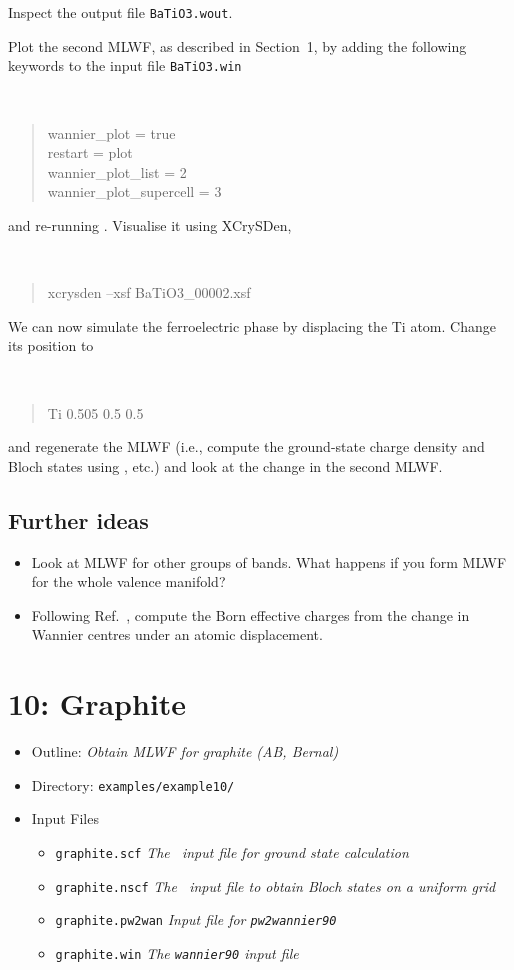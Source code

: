 \documentclass[a4paper,11pt,twoside]{article}
\begin{document}
Inspect the output file {\tt BaTiO3.wout}. 

Plot the second MLWF, as described in Section~1, by adding the
following keywords to the input file {\tt BaTiO3.win}
{\tt
\begin{quote}
wannier\_plot = true\\
restart = plot\\
wannier\_plot\_list = 2\\
wannier\_plot\_supercell = 3
\end{quote} }
and re-running \wannier. Visualise it using XCrySDen,
{\tt
\begin{quote}
xcrysden --xsf BaTiO3\_00002.xsf
\end{quote} }

We can now simulate the ferroelectric phase by displacing the Ti
  atom. Change its position to 
{\tt
\begin{quote}
Ti 0.505 0.5 0.5
\end{quote}
}
and regenerate the MLWF (i.e., compute the ground-state charge
density and Bloch states using \pwscf, etc.) and look at the change in
the second MLWF.

\subsection*{Further ideas}
\begin{itemize}
\item Look at MLWF for other groups of bands. What happens if you form
  MLWF for the whole valence manifold?

\item Following Ref.~\cite{BaTiO3}, compute the Born effective charges from the
  change in Wannier centres under an atomic displacement. 
\end{itemize}

\cleardoublepage

\section*{10: Graphite}
\begin{itemize}
\item{Outline: \it{Obtain MLWF for graphite (AB, Bernal)}}
\item{Directory: {\tt examples/example10/}}
\item{Input Files}
\begin{itemize}
\item{ {\tt graphite.scf}  {\it The \pwscf\ input file for ground
    state calculation}} 
\item{ {\tt graphite.nscf}  {\it The \pwscf\ input file to obtain Bloch
    states on a uniform grid}} 
\item{ {\tt graphite.pw2wan}  {\it Input file for {\tt pw2wannier90}}}
\item{ {\tt graphite.win}  {\it The {\tt wannier90} input file}}
\end{itemize}
\end{itemize}
\end{document}
